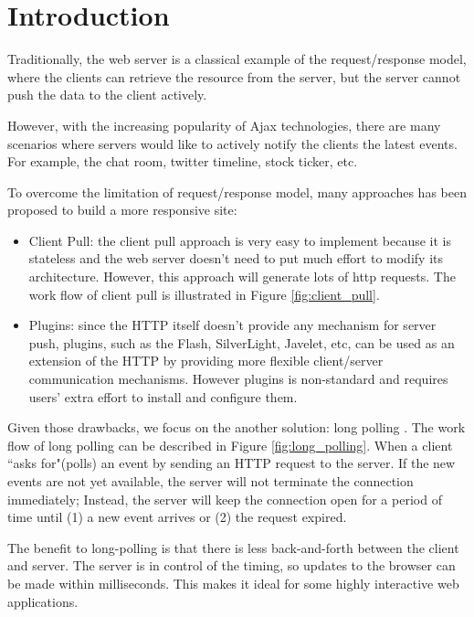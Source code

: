 \section {Introduction\\}
Traditionally, the web server is a classical example of the request/response 
model, where the clients can retrieve the resource from the server, but the 
server cannot push the data to the client actively. 

However, with the increasing popularity of Ajax\cite{Ajax} technologies, there 
are many scenarios where servers would like to actively notify the clients the 
latest events. For example, the chat room, twitter timeline, stock ticker, etc.

To overcome the limitation of request/response model, many approaches has been 
proposed to build a more responsive site:

\begin{itemize}
\item Client Pull: the client pull approach is very easy to implement because 
it is stateless and the web server doesn't need to put much effort to modify 
its architecture. However, this approach will generate lots of http requests.
The work flow of client pull is illustrated in Figure
\ref{fig:client_pull}.

\item Plugins: since the HTTP itself doesn't provide any mechanism for server 
push, plugins, such as the Flash, SilverLight, Javelet, etc, can be used as an 
extension of the HTTP by providing more flexible client/server communication 
mechanisms. However plugins is non-standard and requires users' extra effort to 
install and configure them.
\end{itemize}

Given those drawbacks, we focus on the another solution: long polling
\cite{LongPolling}. The work flow of long polling can be described in Figure
\ref{fig:long_polling}. When a client ``asks for"(polls) an event by sending an
HTTP request to the server. If the new events are not yet available, the server 
will not terminate the connection immediately; Instead, the server will keep 
the connection open for a period of time until (1) a new event arrives or 
(2) the request expired.

The benefit to long-polling is that there is less back-and-forth between the client and server. The server is in control of the timing, so updates to the browser can be made within milliseconds. This makes it ideal for some highly interactive web applications.

